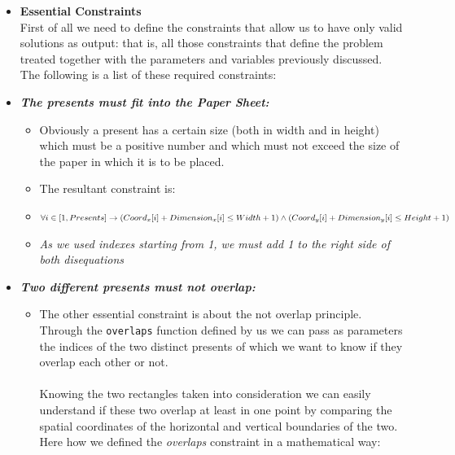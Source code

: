 \begin{itemize}
	\item[] \textbf{Essential Constraints}
	\\
	First of all we need to define the constraints that allow us to have only valid solutions as output: that is, all those constraints that define the problem treated together with the parameters and variables previously discussed.
	\\
	The following is a list of these required constraints:
	\item \textbf{\textit{The presents must fit into the Paper Sheet:}}
	\begin{itemize}
		\item[] Obviously a present has a certain size (both in width and in height) which must be a positive number and which must not exceed the size of the paper in which it is to be placed.
		\item[] The resultant constraint is:
		\item[] $\forall i \in [1, Presents] \rightarrow\\(Coord_x[i] + Dimension_x[i] \leq Width + 1) \wedge \\ (Coord_y[i] + Dimension_y[i] \leq Height + 1)$  
		\item[] \textit{As we used indexes starting from 1, we must add 1 to the right side of both disequations} 
	\end{itemize}
	
	\item \textbf{\textit{Two different presents must not overlap:}}
	\begin{itemize}
		\item[] 
		The other essential constraint is about the not overlap principle.
		\\
		Through the \texttt{overlaps} function defined by us we can pass as parameters the indices of the two distinct presents of which we want to know if they overlap each other or not.
		\\\\
		Knowing the two rectangles taken into consideration we can easily understand if these two overlap at least in one point by comparing the spatial coordinates of the horizontal and vertical boundaries of the two.
		\\
		Here how we defined the \textit{overlaps} constraint in a mathematical way:


\end{itemize}
\end{itemize}
